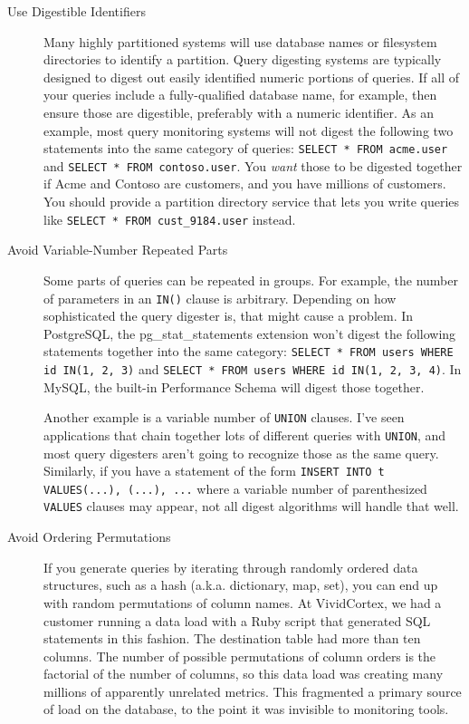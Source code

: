 \documentclass{vivid_layout}
\begin{document}
\begin{description}

\item[Use Digestible Identifiers] Many highly partitioned systems will use
database names or filesystem directories to identify a partition. Query
digesting systems are typically designed to digest out easily identified numeric
portions of queries. If all of your queries include a fully-qualified database
name, for example, then ensure those are digestible, preferably with a numeric
identifier. As an example, most query monitoring systems will not digest the
following two statements into the same category of queries: \texttt{SELECT *
FROM acme.user} and \texttt{SELECT * FROM contoso.user}. You \emph{want}
those to be digested together if Acme and Contoso are customers, and you
have millions of customers. You should provide a partition directory service
that lets you write queries like \texttt{SELECT * FROM cust\_9184.user} instead.

\item[Avoid Variable-Number Repeated Parts] Some parts of queries can be
repeated in groups. For example, the number of parameters in an \texttt{IN()}
clause is arbitrary. Depending on how sophisticated the query digester is, that
might cause a problem. In PostgreSQL, the pg\_stat\_statements extension won't
digest the following statements together into the same category: 
\texttt{SELECT * FROM users WHERE id IN(1, 2, 3)} and
\texttt{SELECT * FROM users WHERE id IN(1, 2, 3, 4)}. In MySQL, the built-in
Performance Schema will digest those together.

Another example is a variable number of \texttt{UNION} clauses. I've seen
applications that chain together lots of different queries with \texttt{UNION},
and most query digesters aren't going to recognize those as the same query.
Similarly, if you have a statement of the form \texttt{INSERT INTO t
VALUES(...), (...), ...} where a variable number of parenthesized
\texttt{VALUES} clauses may appear, not all digest algorithms will handle that
well.

\item[Avoid Ordering Permutations] If you generate queries by iterating through
randomly ordered data structures, such as a hash (a.k.a. dictionary, map, set),
you can end up with random permutations of column names. At VividCortex, we had a
customer running a data load with a Ruby script that generated SQL statements in
this fashion. The destination table had more than ten columns. The number of
possible permutations of column orders is the factorial of the number of
columns, so this data load was creating many millions of apparently unrelated
metrics. This fragmented a primary source of load on the database, to the point it
was invisible to monitoring tools.


\end{description}
\end{document}
